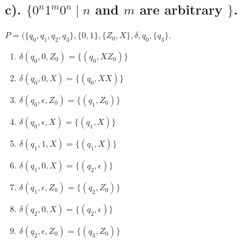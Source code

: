 \documentclass[20pt]{article} %
\begin{document}
\subsection{c). $\{0^{n}1^{m}0^{n} \mid n$ and $m$ are arbitrary $\}$.}
$P = (\{q_0, q_1, q_2, q_3\}, \{0,1\}, \{Z_0, X\}, \delta, q_0, \{q_3\}$.
\begin{enumerate}
\item $\delta(q_0, 0, Z_0) = \{(q_0, XZ_0)\}$
\item $\delta(q_0, 0, X) = \{(q_0, XX)\}$
\item $\delta(q_0, \epsilon, Z_0) = \{(q_1, Z_0)\}$
\item $\delta(q_0, \epsilon, X) = \{(q_1, X)\}$
\item $\delta(q_1, 1, X) = \{(q_1, X)\}$
\item $\delta(q_1, 0, X) = \{(q_2, \epsilon)\}$
\item $\delta(q_1, \epsilon, Z_0) = \{(q_2, Z_0)\}$
\item $\delta(q_2, 0, X) = \{(q_2, \epsilon)\}$
\item $\delta(q_2, \epsilon, Z_0) = \{(q_3, Z_0)\}$
\end{enumerate}
\end{document}
